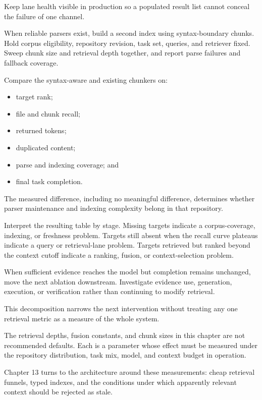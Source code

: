 Keep lane health visible in production so a populated result list cannot conceal the failure of one channel.

When reliable parsers exist, build a second index using syntax-boundary chunks. Hold corpus eligibility, repository revision, task set, queries, and retriever fixed. Sweep chunk size and retrieval depth together, and report parse failures and fallback coverage.


Compare the syntax-aware and existing chunkers on:

\begin{itemize}
\tightlist
\item
  target rank;
\item
  file and chunk recall;
\item
  returned tokens;
\item
  duplicated content;
\item
  parse and indexing coverage; and
\item
  final task completion.
\end{itemize}

The measured difference, including no meaningful difference, determines whether parser maintenance and indexing complexity belong in that repository.

Interpret the resulting table by stage. Missing targets indicate a corpus-coverage, indexing, or freshness problem. Targets still absent when the recall curve plateaus indicate a query or retrieval-lane problem. Targets retrieved but ranked beyond the context cutoff indicate a ranking, fusion, or context-selection problem.

When sufficient evidence reaches the model but completion remains unchanged, move the next ablation downstream. Investigate evidence use, generation, execution, or verification rather than continuing to modify retrieval.

This decomposition narrows the next intervention without treating any one retrieval metric as a measure of the whole system.

The retrieval depths, fusion constants, and chunk sizes in this chapter are not recommended defaults. Each is a parameter whose effect must be measured under the repository distribution, task mix, model, and context budget in operation.

Chapter 13 turns to the architecture around these measurements: cheap retrieval funnels, typed indexes, and the conditions under which apparently relevant context should be rejected as stale.


